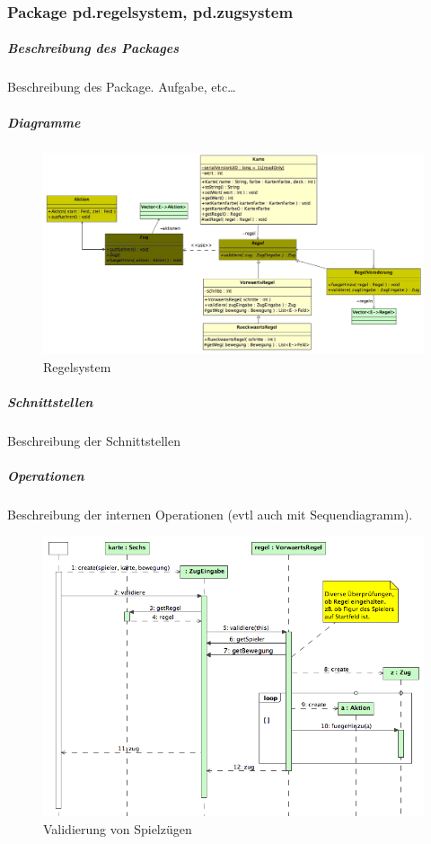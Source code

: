 \documentclass[a4paper,12pt,halfparskip,DIV14]{scrartcl}
\begin{document}
\subsubsection{Package pd.regelsystem, pd.zugsystem} %
\label{ssub:package_pd_regelsystem}
\subparagraph{Beschreibung des Packages} %
\label{ssub:beschreibung_des_packages}
Beschreibung des Package. Aufgabe, etc…
\subparagraph{Diagramme} %
\label{ssub:diagramme}
\begin{figure}
	[htp] \centering 
	\includegraphics[width=1\textwidth]{pd_regelsystem.png} \caption{Regelsystem}\label{fig:pd_regelsystem.png} 
\end{figure}
\subparagraph{Schnittstellen} %
\label{ssub:schnittstellen}
Beschreibung der Schnittstellen
\subparagraph{Operationen} %
\label{ssub:operationen}
Beschreibung der internen Operationen (evtl auch mit Sequendiagramm).
\begin{figure}
	[htp] \centering 
	\includegraphics[width=1\textwidth]{pd_validierung.png} \caption{Validierung von Spielzügen}\label{fig:pd_validierung.png} 
\end{figure}
\end{document}
